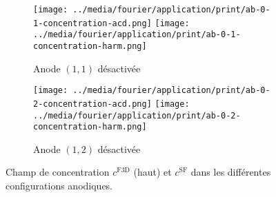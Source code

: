 \begin{figure}[h]
  \begin{center}
    \begin{subfigure}[t]{\textwidth}
      \begin{center}
        \texttt{[image: ../media/fourier/application/print/ab-0-1-concentration-acd.png]}
        \texttt{[image: ../media/fourier/application/print/ab-0-1-concentration-harm.png]}
        \caption{Anode $(1,1)$ désactivée}
        \label{fig:}
      \end{center}
    \end{subfigure}

    \begin{subfigure}[t]{\textwidth}
      \begin{center}
        \texttt{[image: ../media/fourier/application/print/ab-0-2-concentration-acd.png]}
        \texttt{[image: ../media/fourier/application/print/ab-0-2-concentration-harm.png]}
        \caption{Anode $(1,2)$ désactivée}
        \label{fig:}
      \end{center}
    \end{subfigure}


    \caption{Champ de concentration $c^\mathrm{F3D}$ (haut) et
      $c^\mathrm{SF}$ dans les différentes configurations anodiques.}
    \label{fig:harmonic-concentration-comp}
  \end{center}
\end{figure}

